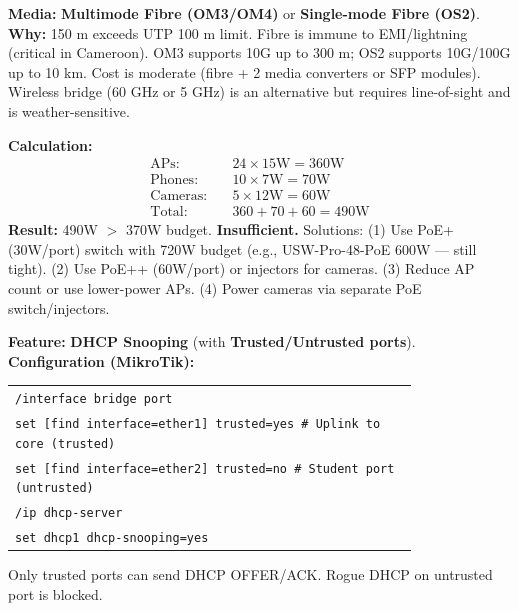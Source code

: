 \documentclass[11pt]{article}
\begin{document}
\begin{corrige}[Exercise 1]
\textbf{Media:} \textbf{Multimode Fibre (OM3/OM4)} or \textbf{Single-mode Fibre (OS2)}.
\textbf{Why:} 150 m exceeds UTP 100 m limit. Fibre is immune to EMI/lightning (critical in Cameroon). OM3 supports 10G up to 300 m; OS2 supports 10G/100G up to 10 km. Cost is moderate (fibre + 2 media converters or SFP modules). Wireless bridge (60 GHz or 5 GHz) is an alternative but requires line-of-sight and is weather-sensitive.
\end{corrige}

\begin{corrige}[Exercise 3]
\textbf{Calculation:}
\begin{align*}
\text{APs:} & \quad 24 \times 15\text{W} = 360\text{W} \\
\text{Phones:} & \quad 10 \times 7\text{W} = 70\text{W} \\
\text{Cameras:} & \quad 5 \times 12\text{W} = 60\text{W} \\
\text{Total:} & \quad 360 + 70 + 60 = 490\text{W}
\end{align*}
\textbf{Result:} 490W $>$ 370W budget. \textbf{Insufficient.} Solutions: (1) Use PoE+ (30W/port) switch with 720W budget (e.g., USW-Pro-48-PoE 600W — still tight). (2) Use PoE++ (60W/port) or injectors for cameras. (3) Reduce AP count or use lower-power APs. (4) Power cameras via separate PoE switch/injectors.
\end{corrige}

\begin{corrige}[Exercise 5]
\textbf{Feature:} \textbf{DHCP Snooping} (with \textbf{Trusted/Untrusted ports}).
\textbf{Configuration (MikroTik):}
\begin{center}
\begin{tabular}{|p{0.8\linewidth}|}\hline
\texttt{/interface bridge port}\\
\texttt{set [find interface=ether1] trusted=yes \# Uplink to core (trusted)}\\
\texttt{set [find interface=ether2] trusted=no \# Student port (untrusted)}\\
\texttt{/ip dhcp-server}\\
\texttt{set dhcp1 dhcp-snooping=yes}\\\hline
\end{tabular}
\end{center}
Only trusted ports can send DHCP OFFER/ACK. Rogue DHCP on untrusted port is blocked.
\end{corrige}
\end{document}
